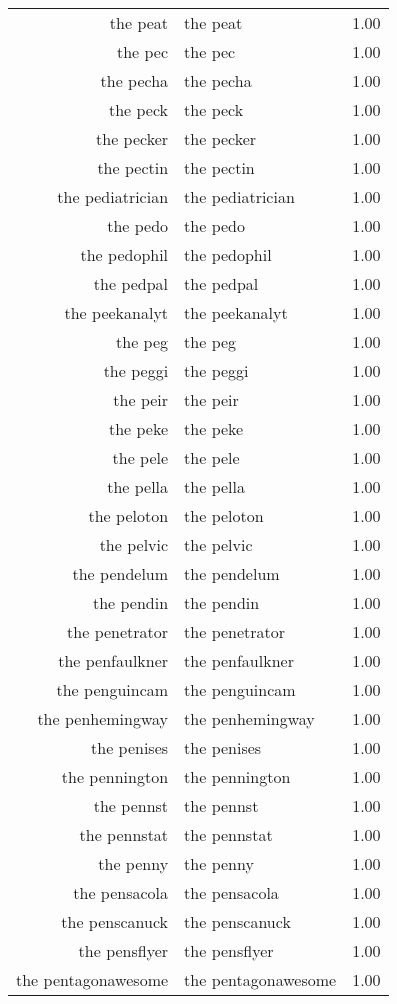 \begin{table}[ht]
\begin{tabular}{rlr}
  the peat & the peat & 1.00 \\ 
  the pec & the pec & 1.00 \\ 
  the pecha & the pecha & 1.00 \\ 
  the peck & the peck & 1.00 \\ 
  the pecker & the pecker & 1.00 \\ 
  the pectin & the pectin & 1.00 \\ 
  the pediatrician & the pediatrician & 1.00 \\ 
  the pedo & the pedo & 1.00 \\ 
  the pedophil & the pedophil & 1.00 \\ 
  the pedpal & the pedpal & 1.00 \\ 
  the peekanalyt & the peekanalyt & 1.00 \\ 
  the peg & the peg & 1.00 \\ 
  the peggi & the peggi & 1.00 \\ 
  the peir & the peir & 1.00 \\ 
  the peke & the peke & 1.00 \\ 
  the pele & the pele & 1.00 \\ 
  the pella & the pella & 1.00 \\ 
  the peloton & the peloton & 1.00 \\ 
  the pelvic & the pelvic & 1.00 \\ 
  the pendelum & the pendelum & 1.00 \\ 
  the pendin & the pendin & 1.00 \\ 
  the penetrator & the penetrator & 1.00 \\ 
  the penfaulkner & the penfaulkner & 1.00 \\ 
  the penguincam & the penguincam & 1.00 \\ 
  the penhemingway & the penhemingway & 1.00 \\ 
  the penises & the penises & 1.00 \\ 
  the pennington & the pennington & 1.00 \\ 
  the pennst & the pennst & 1.00 \\ 
  the pennstat & the pennstat & 1.00 \\ 
  the penny & the penny & 1.00 \\ 
  the pensacola & the pensacola & 1.00 \\ 
  the penscanuck & the penscanuck & 1.00 \\ 
  the pensflyer & the pensflyer & 1.00 \\ 
  the pentagonawesome & the pentagonawesome & 1.00 \\ 

\end{tabular}
\end{table}
